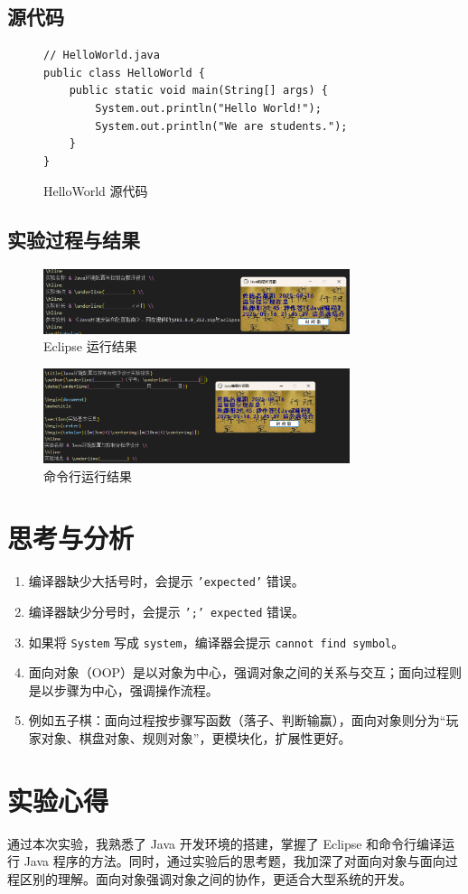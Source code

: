 \documentclass[12pt,a4paper]{article}
\begin{document}
\subsection*{源代码}
\begin{figure}[H]
\centering
\begin{lstlisting}
// HelloWorld.java
public class HelloWorld {
    public static void main(String[] args) {
        System.out.println("Hello World!");
        System.out.println("We are students.");
    }
}
\end{lstlisting}
\caption{HelloWorld 源代码}
\end{figure}

\subsection*{实验过程与结果}

\begin{figure}[H]
\centering
\includegraphics[width=0.8\textwidth]{eclipse_result.png}
\caption{Eclipse 运行结果}
\end{figure}

\begin{figure}[H]
\centering
\includegraphics[width=0.8\textwidth]{cmd_result.png}
\caption{命令行运行结果}
\end{figure}

\section*{思考与分析}
\begin{enumerate}
    \item 编译器缺少大括号时，会提示 \texttt{'expected'} 错误。
    \item 编译器缺少分号时，会提示 \texttt{';' expected} 错误。
    \item 如果将 \texttt{System} 写成 \texttt{system}，编译器会提示 \texttt{cannot find symbol}。
    \item 面向对象（OOP）是以对象为中心，强调对象之间的关系与交互；面向过程则是以步骤为中心，强调操作流程。  
    \item 例如五子棋：面向过程按步骤写函数（落子、判断输赢），面向对象则分为“玩家对象、棋盘对象、规则对象”，更模块化，扩展性更好。
\end{enumerate}

\section*{实验心得}
通过本次实验，我熟悉了 Java 开发环境的搭建，掌握了 Eclipse 和命令行编译运行 Java 程序的方法。同时，通过实验后的思考题，我加深了对面向对象与面向过程区别的理解。面向对象强调对象之间的协作，更适合大型系统的开发。
\end{document}
